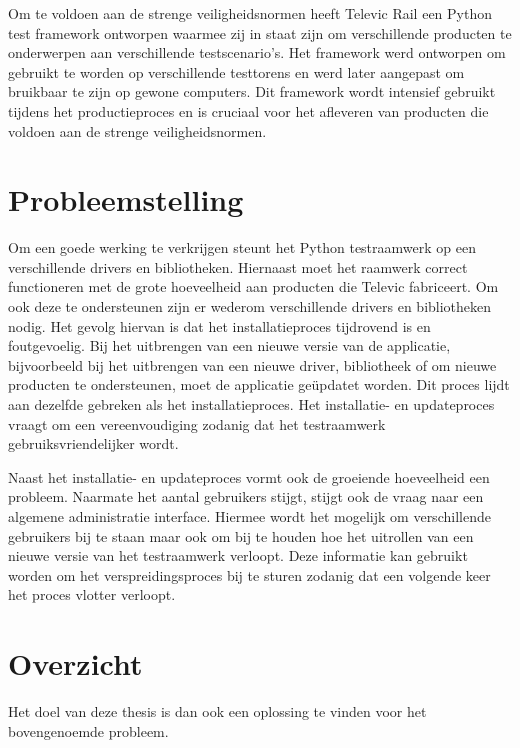 Om te voldoen aan de strenge veiligheidsnormen heeft Televic Rail een Python test framework ontworpen waarmee zij in staat zijn om verschillende producten te onderwerpen aan verschillende testscenario's.
Het framework werd ontworpen om gebruikt te worden op verschillende testtorens en werd later aangepast om bruikbaar te zijn op gewone computers.
Dit framework wordt intensief gebruikt tijdens het productieproces en is cruciaal voor het afleveren van producten die voldoen aan de strenge veiligheidsnormen.

\section{Probleemstelling}\label{sec:probleem}
Om een goede werking te verkrijgen steunt het Python testraamwerk op een verschillende drivers en bibliotheken.
Hiernaast moet het raamwerk correct functioneren met de grote hoeveelheid aan producten die Televic fabriceert.
Om ook deze te ondersteunen zijn er wederom verschillende drivers en bibliotheken nodig.
Het gevolg hiervan is dat het installatieproces tijdrovend is en foutgevoelig.
Bij het uitbrengen van een nieuwe versie van de applicatie, bijvoorbeeld bij het uitbrengen van een nieuwe driver, bibliotheek of om nieuwe producten te ondersteunen, moet de applicatie geüpdatet worden.
Dit proces lijdt aan dezelfde gebreken als het installatieproces.
Het installatie- en updateproces vraagt om een vereenvoudiging zodanig dat het testraamwerk gebruiksvriendelijker wordt.

Naast het installatie- en updateproces vormt ook de groeiende hoeveelheid een probleem.
Naarmate het aantal gebruikers stijgt, stijgt ook de vraag naar een algemene administratie interface.
Hiermee wordt het mogelijk om verschillende gebruikers bij te staan maar ook om bij te houden hoe het uitrollen van een nieuwe versie van het testraamwerk verloopt.
Deze informatie kan gebruikt worden om het verspreidingsproces bij te sturen zodanig dat een volgende keer het proces vlotter verloopt.

\section{Overzicht}
Het doel van deze thesis is dan ook een oplossing te vinden voor het bovengenoemde probleem.